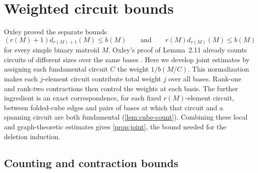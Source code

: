 \documentclass[10pt,a4paper]{article}
\numberwithin{equation}{section}
\begin{document}
\section{Weighted circuit bounds}\label{sec:weights}
Oxley \cite[Lemmas~2.2 and~2.7]{Oxley1983} proved the separate bounds
\[
(r(M)+1)d_{r(M)+1}(M)\le b(M)\qquad\text{and}\qquad r(M)d_{r(M)}(M)\le b(M)
\]
for every simple binary matroid \(M\).
Oxley's proof of Lemma~2.11 already counts circuits of different sizes
over the same bases \cite{Oxley1983}.
Here we develop joint estimates by assigning each fundamental circuit
\(C\) the weight \(1/b(M/C)\). This normalization makes each
\(j\)-element circuit contribute total weight \(j\) over all bases.
Rank-one and rank-two contractions then control the weights at each basis.
The further ingredient is an exact correspondence, for each fixed
\(r(M)\)-element circuit, between folded-cube edges and pairs of bases
at which that circuit and a spanning circuit are both fundamental
(\autoref{lem:cube-count}).
Combining these local and graph-theoretic estimates gives
\autoref{prop:joint}, the bound needed for the deletion induction.

\subsection{Counting and contraction bounds}
\end{document}
